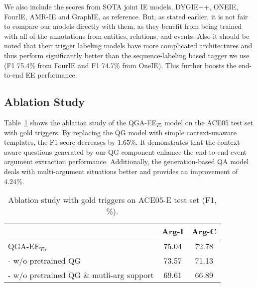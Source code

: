 We also include the scores from SOTA joint IE models, DYGIE++, ONEIE, FourIE, AMR-IE and GraphIE, as reference. But, as stated earlier, it is not fair to compare our models directly with them, as they benefit from being trained with all of the annotations from entities, relations, and events. 
Also it should be noted that their trigger labeling models have more complicated architectures and thus perform  significantly better than the sequence-labeling based tagger we use (F1 75.4\% from FourIE and F1 74.7\% from OneIE). This further boosts the end-to-end EE performance. 

\subsection{Ablation Study}

Table~\ref{tab:abalation_gold} shows the ablation study of the QGA-EE$_{T5}$ model on the ACE05 test set with gold triggers. By replacing the QG model with simple context-unaware templates, the F1 score decreases by $1.65\%$. It demonstrates that the context-aware questions generated by our QG component enhance the end-to-end event argument extraction performance. Additionally, the generation-based QA model deals with multi-argument situations better and provides an improvement of  $4.24\%$.

        
  

        

\begin{table}[ht]
    \centering
    \small
    \begin{tabular}{l|cc}
    \hline
    {} & {Arg-I} & {Arg-C}\\
    \hline
        {QGA-EE$_{T5}$} & {75.04} & {72.78}  \\
    \hline
        
        {- w/o pretrained QG} & {73.57} & {71.13} \\
    \hline
        {- w/o pretrained QG \& mutli-arg support} & {69.61} & {66.89} \\
    \hline
        
    \end{tabular}
    \caption{Ablation study with gold triggers on ACE05-E test set (F1, \%).}
    \label{tab:abalation_gold}
\end{table}

